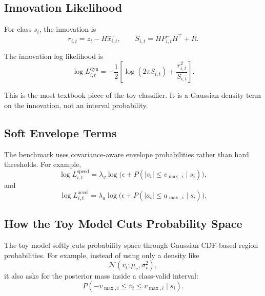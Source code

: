 \documentclass[11pt]{article}
\begin{document}
\subsection{Innovation Likelihood}

For class $s_i$, the innovation is
\begin{equation}
    r_{i,t} = z_t - H \hat{x}_{i,t}^{-},
    \qquad
    S_{i,t} = H P_{i,t}^{-} H^\top + R.
\end{equation}

The innovation log likelihood is
\begin{equation}
    \log L^{\text{dyn}}_{i,t}
    =
    -\frac{1}{2}
    \left[
        \log(2\pi S_{i,t}) + \frac{r_{i,t}^2}{S_{i,t}}
    \right].
\end{equation}

This is the most textbook piece of the toy classifier. It is a Gaussian
density term on the innovation, not an interval probability.

\subsection{Soft Envelope Terms}

The benchmark uses covariance-aware envelope probabilities rather than hard
thresholds. For example,
\begin{equation}
    \log L^{\text{speed}}_{i,t}
    =
    \lambda_v \log\!\Big(
        \epsilon + P(|v_t| \leq v_{\max,i} \mid s_i)
    \Big),
\end{equation}
and
\begin{equation}
    \log L^{\text{accel}}_{i,t}
    =
    \lambda_a \log\!\Big(
        \epsilon + P(|a_t| \leq a_{\max,i} \mid s_i)
    \Big).
\end{equation}

\subsection{How the Toy Model Cuts Probability Space}

The toy model softly cuts probability space through Gaussian CDF-based region
probabilities. For example, instead of using only a density like
\begin{equation}
    \mathcal{N}(v_t; \mu_v, \sigma_v^2),
\end{equation}
it also asks for the posterior mass inside a class-valid interval:
\begin{equation}
    P(-v_{\max,i} \leq v_t \leq v_{\max,i} \mid s_i).
\end{equation}
\end{document}
